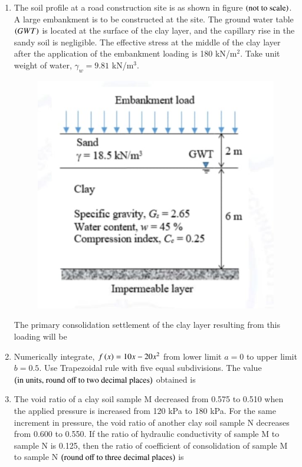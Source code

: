 \documentclass[journal,12pt,onecolumn]{article}
\theoremstyle{remark}
\begin{document}
\begin{enumerate}
\item The soil profile at a road construction site is as shown in figure  $\left(\text{not to scale}\right)$. A large embankment is to be constructed at the site. The ground water table $\left(GWT\right)$ is located at the surface of the clay layer, and the capillary rise in the sandy soil is negligible. The effective stress at the middle of the clay layer after the application of the embankment loading is 180 kN/m$^2$. Take unit weight of water, $\gamma_w = 9.81$ kN/m$^3$.
\begin{figure}[H]
    \centering
    \includegraphics[width=0.7\columnwidth]{figs/2q45.jpg}
    \caption{}
    \label{fig:q45}
\end{figure}
The primary consolidation settlement  of the clay layer resulting from this loading will be \underline{\hspace{2cm}}

\hfill{}

\item Numerically integrate, $f\left(x\right) = 10x - 20x^2$ from lower limit $a = 0$ to upper limit $b = 0.5$. Use Trapezoidal rule with five equal subdivisions. The value $\left(\text{in units, round off to two decimal places}\right)$ obtained is \underline{\hspace{2cm}}

\hfill{}

\item The void ratio of a clay soil sample M decreased from 0.575 to 0.510 when the applied pressure is increased from 120 kPa to 180 kPa. For the same increment in pressure, the void ratio of another clay soil sample N decreases from 0.600 to 0.550. If the ratio of hydraulic conductivity of sample M to sample N is 0.125, then the ratio of coefficient of consolidation of sample M to sample N $\left(\text{round off to three decimal places}\right)$ is \underline{\hspace{2cm}}


\end{enumerate}
\end{document}
